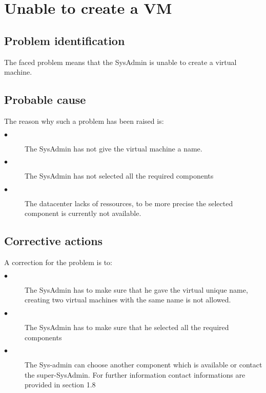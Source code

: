 \section{Unable to create a VM} 

\subsection{Problem identification}
The faced problem means that the SysAdmin is unable to create a virtual machine.

\subsection{Probable cause}

The reason why such a problem has been raised is:\\
\begin{description}
\item[$\bullet$] The SysAdmin has not give the virtual machine a name.
\item[$\bullet$] The SysAdmin has not selected all the required components
\item[$\bullet$] The datacenter lacks of ressources, to be more precise the
selected component is currently not available.
\end{description}


\subsection{Corrective actions}

A correction for the problem is to:\\
\begin{description}
\item[$\bullet$] The SysAdmin has to make sure that he gave the virtual unique name,
creating two virtual machines with the same name is not allowed.
\item[$\bullet$] The SysAdmin has to make sure that he selected all the required
components
\item[$\bullet$] The Sys-admin can choose another component which is available or
contact the super-SysAdmin. For further information contact informations are provided
in section 1.8
\end{description}












